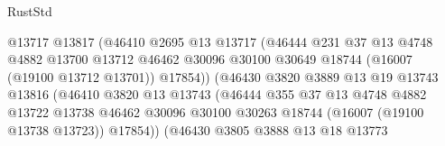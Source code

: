 \begin{lexlean}{RustStd}
\begin{coremodule}
                                      @13717
                                      @13817
                                      (@46410
                                        @2695
                                        @13
                                        @13717
                                        (@46444
                                          @231
                                          @37
                                          @13
                                          @4748
                                          @4882
                                          @13700
                                          @13712
                                          @46462
                                          @30096
                                          @30100
                                          @30649
                                          @18744
                                          (@16007 (@19100 @13712 @13701))
                                          @17854))
                                      (@46430
                                        @3820
                                        @3889
                                        @13
                                        @19
                                        @13743
                                        @13816
                                        (@46410
                                          @3820
                                          @13
                                          @13743
                                          (@46444
                                            @355
                                            @37
                                            @13
                                            @4748
                                            @4882
                                            @13722
                                            @13738
                                            @46462
                                            @30096
                                            @30100
                                            @30263
                                            @18744
                                            (@16007 (@19100 @13738 @13723))
                                            @17854))
                                        (@46430
                                          @3805
                                          @3888
                                          @13
                                          @18
                                          @13773

\end{coremodule}
\end{lexlean}
